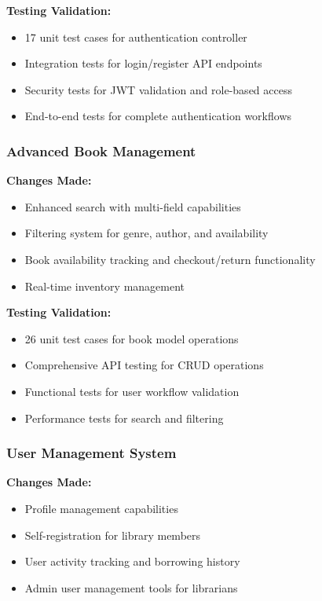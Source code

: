 \documentclass[12pt,a4paper]{article}
\begin{document}
\textbf{Testing Validation:}
\begin{itemize}[leftmargin=*]
    \item 17 unit test cases for authentication controller
    \item Integration tests for login/register API endpoints
    \item Security tests for JWT validation and role-based access
    \item End-to-end tests for complete authentication workflows
\end{itemize}

\subsubsection{Advanced Book Management}
\textbf{Changes Made:}
\begin{itemize}[leftmargin=*]
    \item Enhanced search with multi-field capabilities
    \item Filtering system for genre, author, and availability
    \item Book availability tracking and checkout/return functionality
    \item Real-time inventory management
\end{itemize}

\textbf{Testing Validation:}
\begin{itemize}[leftmargin=*]
    \item 26 unit test cases for book model operations
    \item Comprehensive API testing for CRUD operations
    \item Functional tests for user workflow validation
    \item Performance tests for search and filtering
\end{itemize}

\subsubsection{User Management System}
\textbf{Changes Made:}
\begin{itemize}[leftmargin=*]
    \item Profile management capabilities
    \item Self-registration for library members
    \item User activity tracking and borrowing history
    \item Admin user management tools for librarians
\end{itemize}
\end{document}
